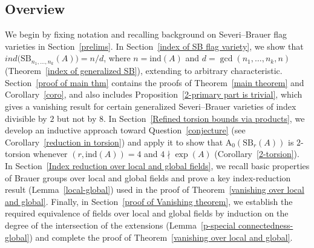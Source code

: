 \documentclass[10pt]{amsart}
\theoremstyle{plain}
\theoremstyle{definition}
\begin{document}
\subsection{Overview}
We begin by fixing notation and recalling background on Severi--Brauer flag varieties in Section~\ref{prelims}. In Section~\ref{index of SB flag variety}, we show that 
\(ind\big(\mathrm{SB}_{n_1,\ldots,n_k}(A)\big)=n/d\), where \(n=\mathrm{ind}(A)\) and \(d=\gcd(n_1,\ldots,n_k,n)\) (Theorem~\ref{index of generalized SB}), extending \cite[Lemma~7.1]{zerocycle} to arbitrary characteristic. Section~\ref{proof of main thm} contains the proofs of Theorem~\ref{main theorem} and Corollary~\ref{coro}, and also includes Proposition~\ref{2-primary part is trivial}, which gives a vanishing result for certain generalized Severi--Brauer varieties of index divisible by \(2\) but not by \(8\). In Section~\ref{Refined torsion bounds via products}, we develop an inductive approach toward Question~\ref{conjecture} (see Corollary~\ref{reduction in torsion}) and apply it to show that \(\mathrm{A_0}(\mathrm{SB}_r(A))\) is \(2\)-torsion whenever \((r,\mathrm{ind}(A))=4\) and \(4 \nmid \exp(A)\) (Corollary~\ref{2-torsion}). In Section~\ref{Index reduction over local and global fields}, we recall basic properties of Brauer groups over local and global fields and prove a key index-reduction result (Lemma~\ref{local-global}) used in the proof of Theorem~\ref{vanishing over local and global}. Finally, in Section~\ref{proof of Vanishing theorem}, we establish the required equivalence of fields over local and global fields by induction on the degree of the intersection of the extensions (Lemma~\ref{p-special connectedness-global}) and complete the proof of Theorem~\ref{vanishing over local and global}.
\end{document}
